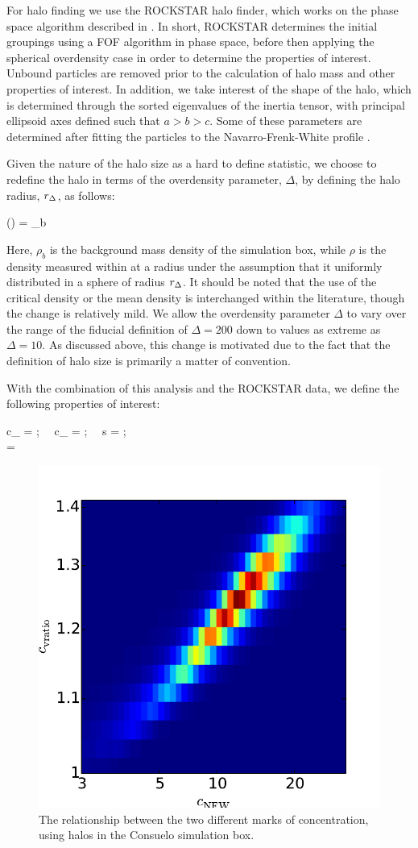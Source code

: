 \documentclass[usenatbib,usegraphicx,letterpaper]{mn2e}
\begin{document}
For halo finding we use the ROCKSTAR halo finder, which works on the phase space algorithm described in \citet*{behroozi13}. In short, ROCKSTAR determines the initial groupings using a FOF algorithm in phase space, before then applying the spherical overdensity case in order to determine the properties of interest. Unbound particles are removed prior to the calculation of halo mass and other properties of interest. In addition, we take interest of the shape of the halo, which is determined through the sorted eigenvalues of the inertia tensor, with principal ellipsoid axes defined such that $a >b > c$. Some of these parameters are determined after fitting the particles to the Navarro-Frenk-White profile \citep*{nfw97}.

Given the nature of the halo size as a hard to define statistic, we choose to redefine the halo in terms of the overdensity parameter, $\Delta$, by defining the halo radius, $r_{\Delta}$, as follows:

\beq
	\rho(\Rdel) = \Delta \rho_b
\eeq

Here, $\rho_b$ is the background mass density of the simulation box, while $\rho$ is the density measured within at a radius under the assumption that it uniformly distributed in a sphere of radius $r_{\Delta}$. It should be noted that the use of the critical density or the mean density is interchanged within the literature, though the change is relatively mild. We allow the overdensity parameter $\Delta$ to vary over the range of the fiducial definition of $\Delta = 200$ down to values as extreme as $\Delta = 10$. As discussed above, this change is motivated due to the fact that the definition of halo size is primarily a matter of convention.

With the combination of this analysis and the ROCKSTAR data, we define the following properties of interest:

\beq
	c_{} =  ; \ \ c_{} = ; \ \ s = ; \\ \Lambda =  \\
\eeq

\begin{figure}
	\centering
		\includegraphics[width=.5\textwidth]{ldcompare_cnfwvscvrat_z00.pdf}
	\caption{The relationship between the two different marks of concentration, using halos in the Consuelo simulation box.}
\end{figure}
\end{document}

